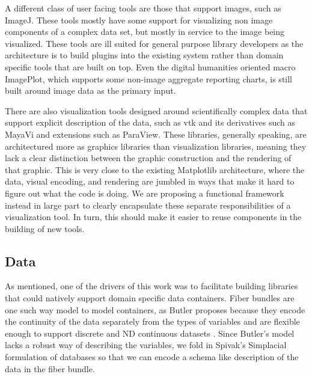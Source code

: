 \documentclass[../main.tex]{subfiles}
\begin{document}
A different class of user facing tools are those that support images, such as ImageJ\cite{schneiderNIHImageImageJ2012}. These tools mostly have some support for visualizing non image components of a complex data set, but mostly in service to the image being visualized. These tools are ill suited for general purpose library developers as the architecture is to build plugins into the existing system \cite{WritingPlugins} rather than domain specific tools that are built on top. Even the digital humanities oriented macro ImagePlot\cite{studiesCulturevisImageplot2021}, which supports some non-image aggregate reporting charts, is still built around image data as the primary input. 

There are also visualization tools designed around scientifically complex data that support explicit description of the data, such as vtk\cite{hanwellVisualizationToolkitVTK2015,geveci2012vtk} and its derivatives such as MayaVi\cite{ramachandranMayaVi2011} and extensions such as ParaView\cite{ahrens2005paraview}. These libraries, generally speaking, are architectured more as graphics libraries than visualization libraries, meaning they lack a clear distinction between the graphic construction and the rendering of that graphic. This is very close to the existing Matplotlib architecture, where the data, visual encoding, and rendering are jumbled in ways that make it hard to figure out what the code is doing. We are proposing a functional framework instead in large part to clearly encapsulate these separate responsibilities of a visualization tool. In turn, this should make it easier to reuse components in the building of new tools. 


\subsection{Data}
\label{sec:intro_data}
As mentioned, one of the drivers of this work was to facilitate building libraries that could natively support domain specific data containers. Fiber bundles are one such way model to model containers, as Butler proposes because they encode the continuity of the data separately from the types of variables and are flexible enough to support discrete and ND continuous datasets \cite{butlerVisualizationModelBased1989,butlerVectorBundleClassesForm1992}. Since Butler's model lacks a robust way of describing the variables, we fold in Spivak's Simplacial formulation of databases \cite{spivakDatabasesAreCategories2010,spivakSIMPLICIALDATABASES} so that we can encode a schema like description of the data in the fiber bundle.
\end{document}
